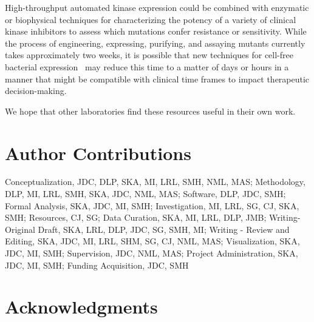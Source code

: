 \documentclass[phd,tocprelim]{cornell}
\begin{document}
High-throughput automated kinase expression could be combined with enzymatic or biophysical techniques for characterizing the potency of a variety of clinical kinase inhibitors to assess which mutations confer resistance or sensitivity.
While the process of engineering, expressing, purifying, and assaying mutants currently takes approximately two weeks, it is possible that new techniques for cell-free bacterial expression~\citep{Kim:Biotechnol.Bioeng.:1999,Sawasaki:Proc.Natl.Acad.Sci.:2002a} may reduce this time to a matter of days or hours in a manner that might be compatible with clinical time frames to impact therapeutic decision-making.

We hope that other laboratories find these resources useful in their own work.


\section{Author Contributions}

Conceptualization, JDC, DLP, SKA, MI, LRL, SMH, NML, MAS; Methodology, DLP, MI, LRL, SMH, SKA, JDC, NML, MAS; Software, DLP, JDC, SMH; Formal Analysis, SKA, JDC, MI, SMH; Investigation, MI, LRL, SG, CJ, SKA, SMH; Resources, CJ, SG;  Data Curation, SKA, MI, LRL, DLP, JMB; Writing-Original Draft, SKA, LRL, DLP, JDC, SG, SMH, MI; Writing - Review and Editing, SKA, JDC, MI, LRL, SHM, SG, CJ, NML, MAS; Visualization, SKA, JDC, MI, SMH; Supervision, JDC, NML, MAS; Project Administration, SKA, JDC, MI, SMH; Funding Acquisition, JDC, SMH


\section{Acknowledgments}
\end{document}
